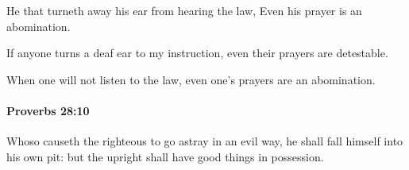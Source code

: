 			\begin{versebox}
					\item[BHS] 
					\item[ASV] He that turneth away his ear from hearing the law, Even his prayer is an abomination.
					\item[NIV] If anyone turns a deaf ear to my instruction, even their prayers are detestable.
					\item[NRSV] When one will not listen to the law, even one’s prayers are an abomination.
			\end{versebox}

		\paragraph{Proverbs 28:10} %
			\label{PROVERBS-28-10}

			Whoso causeth the righteous to go astray in an evil way, he shall fall himself into his own pit: but the upright shall have good things in possession.

